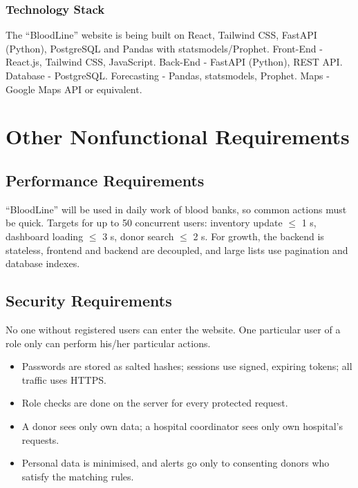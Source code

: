 \documentclass{scrreprt}
\begin{document}
\subsection*{Technology Stack}
The ``BloodLine'' website is being built on React, Tailwind CSS, FastAPI (Python), PostgreSQL and Pandas with statsmodels/Prophet.
\newline
Front-End - React.js, Tailwind CSS, JavaScript.
\newline
Back-End - FastAPI (Python), REST API.
\newline
Database - PostgreSQL.
\newline
Forecasting - Pandas, statsmodels, Prophet. Maps - Google Maps API or equivalent.

\chapter{Other Nonfunctional Requirements}

\section{Performance Requirements}
``BloodLine'' will be used in daily work of blood banks, so common actions must be quick. Targets for up to 50 concurrent users: inventory update $\le$ 1 s, dashboard loading $\le$ 3 s, donor search $\le$ 2 s. For growth, the backend is stateless, frontend and backend are decoupled, and large lists use pagination and database indexes.

\section{Security Requirements}
No one without registered users can enter the website. One particular user of a role only can perform his/her particular actions.
\begin{itemize}
    \item Passwords are stored as salted hashes; sessions use signed, expiring tokens; all traffic uses HTTPS.
    \item Role checks are done on the server for every protected request.
    \item A donor sees only own data; a hospital coordinator sees only own hospital's requests.
    \item Personal data is minimised, and alerts go only to consenting donors who satisfy the matching rules.
\end{itemize}
\end{document}
